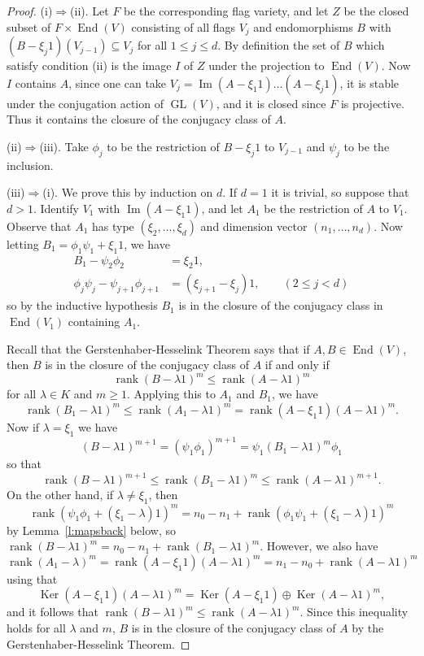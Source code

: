 \documentclass{amsart}
\theoremstyle{plain}
\theoremstyle{definition}
\theoremstyle{remark}
\DeclareMathOperator{\GL}{GL}
\DeclareMathOperator{\Ker}{Ker}
\DeclareMathOperator{\Ima}{Im}
\DeclareMathOperator{\End}{End}
\DeclareMathOperator{\rank}{rank}
\begin{document}
\begin{proof}
(i)$\Rightarrow$(ii).
Let $F$ be the corresponding flag variety, and let $Z$ be the closed
subset of $F\times\End(V)$ consisting of all flags $V_j$ and endomorphisms
$B$ with $(B-\xi_j 1)(V_{j-1}) \subseteq V_j$ for all $1\le j\le d$.
By definition the set of $B$ which satisfy condition (ii) is the image $I$
of $Z$ under the projection to $\End(V)$.
Now $I$ contains $A$, since one can take $V_j = \Ima(A-\xi_1 1)\dots (A-\xi_j 1)$,
it is stable under the conjugation action of $\GL(V)$, and
it is closed since $F$ is projective. Thus it contains the closure
of the conjugacy class of $A$.

(ii)$\Rightarrow$(iii).
Take $\phi_j$ to be the restriction of $B-\xi_j 1$ to $V_{j-1}$ and $\psi_j$ to be the inclusion.

(iii)$\Rightarrow$(i).
We prove this by induction on $d$. If $d=1$ it is trivial, so suppose that $d>1$.
Identify $V_1$ with $\Ima(A-\xi_1 1)$, and let $A_1$ be the restriction of $A$ to $V_1$.
Observe that $A_1$ has type $(\xi_2,\dots,\xi_d)$ and dimension vector $(n_1,\dots,n_d)$.
Now letting $B_1 = \phi_1 \psi_1 + \xi_1 1$, we have
\[
\begin{split}
B_1 - \psi_2 \phi_2
&= \xi_2 1,
\\
\phi_{j} \psi_{j} - \psi_{j+1}\phi_{j+1}
&= (\xi_{j+1}-\xi_{j}) 1,
\qquad (2\le j < d)
\end{split}
\]
so by the inductive hypothesis $B_1$ is in the closure of the conjugacy class in $\End(V_1)$
containing $A_1$.

Recall that the Gerstenhaber-Hesselink Theorem \cite[Theorem 1.7]{Gerstenhaber}
says that if $A,B\in\End(V)$, then $B$ is in the closure of the conjugacy class of $A$ if and only if
\[
\rank (B-\lambda 1)^m \le \rank (A-\lambda 1)^m
\]
for all $\lambda\in K$ and $m\ge 1$. Applying this to $A_1$ and $B_1$, we have
\[
\rank  (B_1-\lambda 1)^m \le \rank (A_1-\lambda 1)^m = \rank (A-\xi_1 1)(A-\lambda 1)^m.
\]
Now if $\lambda=\xi_1$ we have
\[
(B-\lambda1)^{m+1} = (\psi_1 \phi_1)^{m+1} = \psi_1 (B_1 - \lambda 1)^m \phi_1
\]
so that
\[
\rank (B-\lambda1)^{m+1} \le \rank (B_1 - \lambda 1)^m \le \rank (A-\lambda 1)^{m+1}.
\]
On the other hand, if $\lambda\neq \xi_1$, then
\[
\rank(\psi_1\phi_1 + (\xi_1-\lambda)1)^m = n_0 - n_1 + \rank(\phi_1\psi_1 +(\xi_1-\lambda)1)^m
\]
by Lemma~\ref{l:mapsback} below, so
$\rank (B-\lambda 1)^m = n_0 - n_1 + \rank (B_1 - \lambda 1)^m$.
However, we also have
\[
\rank (A_1 - \lambda)^m = \rank (A-\xi_1 1)(A-\lambda 1)^m = n_1 - n_0 + \rank(A-\lambda 1)^m
\]
using that
\[
\Ker (A-\xi_1 1)(A-\lambda1)^m  = \Ker(A-\xi_1 1)\oplus \Ker(A-\lambda1)^m,
\]
and it follows that $\rank (B-\lambda1)^m \le \rank (A-\lambda1)^m$.
Since this inequality holds for all $\lambda$ and $m$, $B$ is in the closure of the conjugacy class of $A$
by the Gerstenhaber-Hesselink Theorem.
\end{proof}
\end{document}
